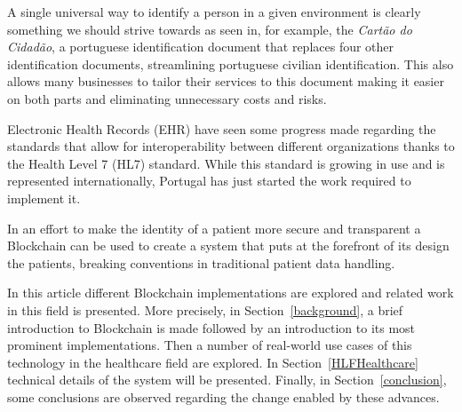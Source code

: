 A single universal way to identify a person in a given environment is clearly
something we should strive towards as seen in, for example, the \textit{Cartão
do Cidadão}, a portuguese identification document that replaces four other
identification documents, streamlining portuguese civilian identification.
This also allows many businesses to tailor their services to this document
making it easier on both parts and eliminating unnecessary costs and risks.

Electronic Health Records (EHR) have seen some progress made regarding the
standards that allow for interoperability between different organizations
thanks to the Health Level 7 (HL7) standard.  While this standard is growing in
use and is represented internationally, Portugal has just started the work
required to implement it.  \cite{HealthLevel7}

In an effort to make the identity of a patient more secure and transparent a
Blockchain can be used to create a system that puts at the forefront of its
design the patients, breaking conventions in traditional patient data handling.

In this article different Blockchain implementations are explored and related
work in this field is presented.  More precisely, in Section~\ref{background},
a brief introduction to Blockchain is made followed by an introduction to its
most prominent implementations. Then a number of real-world use cases of this
technology in the healthcare field are explored. In Section~\ref{HLFHealthcare}
technical details of the system will be presented.  Finally, in
Section~\ref{conclusion},  some conclusions are observed regarding the change
enabled by these advances.

